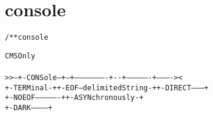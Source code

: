 \section{console}
\begin{shaded}
\begin{alltt}
/** console

                                               { CMS Only                 }
                                               {                          }
   >>--+-CONSole--+--+----------------------+- { -+----------------+----- } ----><
       +-TERMinal-+  +-EOF--delimitedString-+  {  +-DIRECT---------+      }
                     +-NOEOF----------------+  {  +-ASYNchronously-+      }
                                               {  +-DARK-----------+      }
\end{alltt}
\end{shaded}
